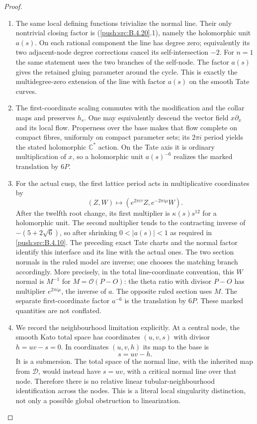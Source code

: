 \begin{proof}
\begin{enumerate}[label=\arabic*.,leftmargin=*]
\item The same local defining functions trivialize the
normal line. Their only nontrivial closing factor
is (\ref{push:src:B.4.20}.1), namely the holomorphic unit $a(s)$.
On each rational component the line has degree
zero; equivalently its two adjacent-node degree
corrections cancel its self-intersection $-2$.
For $n=1$ the same statement uses the two branches
of the self-node. The factor $a(s)$ gives the
retained gluing parameter around the cycle.
This is exactly the multidegree-zero extension
of the line with factor $a(s)$ on the smooth
Tate curves.

\item The first-coordinate scaling commutes with the
modification and the collar maps and preserves
$h_s$. One may equivalently descend the vector
field $x\partial_x$ and its local flow. Properness
over the base makes that flow complete on compact
fibres, uniformly on compact parameter sets;
its $2\pi i$ period yields the stated holomorphic
$\mathbb C^*$ action. On the Tate axis it is
ordinary multiplication of $x$, so a holomorphic
unit $a(s)^{-6}$ realizes the marked translation
by $6P$.

\item For the actual cusp, the first lattice period
acts in multiplicative coordinates by
\[
 (Z,W)\longmapsto
       (e^{2\pi i\tau}Z,e^{-2\pi i\mu}W).
\]
After the twelfth root change, its first multiplier
is $\kappa(s)s^{12}$ for a holomorphic unit.
The second multiplier tends to the contracting
inverse of $-(5+2\sqrt6)$, so after shrinking
$0<|a(s)|<1$ as required in \ref{push:src:B.4.10}.
The preceding exact Tate charts and the normal
factor identify this interface and its line with
the actual ones. The two section normals in the
ruled model are inverse; one chooses the matching
branch accordingly. More precisely, in the total
line-coordinate convention, this $W$ normal is
$M^{-1}$ for $M=\mathcal O(P-O)$: the theta ratio
with divisor $P-O$ has multiplier $e^{2\pi i\mu}$,
the inverse of $a$. The opposite ruled section
uses $M$. The separate first-coordinate factor
$a^{-6}$ is the translation by $6P$.
These marked quantities are not conflated.

\item We record the neighbourhood limitation explicitly.
At a central node, the smooth Kato total space
has coordinates $(u,v,s)$ with divisor
$h=uv-s=0$. In coordinates $(u,v,h)$ its map to
the base is
\[
 s=uv-h.
 \tag{B.4.20.2}
\]
It is a submersion. The total space of the normal
line, with the inherited map from $\mathcal D$,
would instead have $s=uv$, with a critical normal
line over that node. Therefore there is no
relative linear tubular-neighbourhood identification
across the nodes. This is a literal local
singularity distinction, not only a possible
global obstruction to linearization.


\end{enumerate}
\end{proof}
